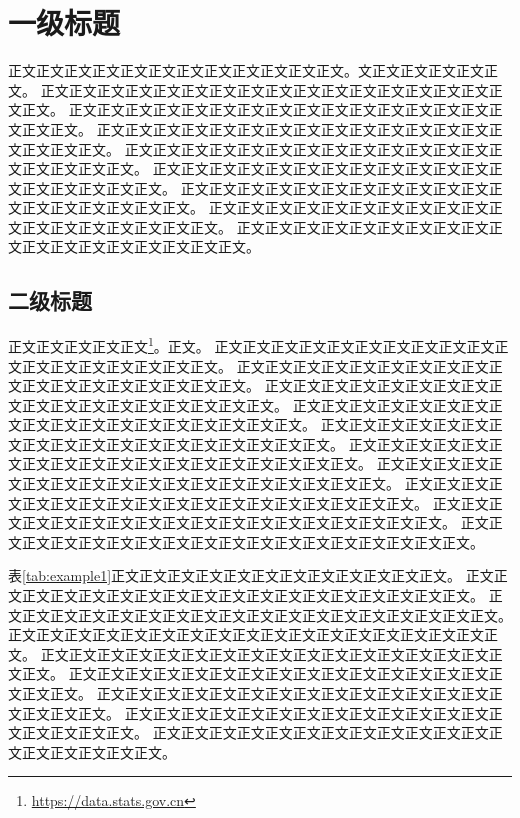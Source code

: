 
\chapter{一级标题}
正文正文正文正文正文正文正文正文正文正文正文正文。文正文正文正文正文正文。
正文正文正文正文正文正文正文正文正文正文正文正文正文正文正文正文正文正文。
正文正文正文正文正文正文正文正文正文正文正文正文正文正文正文正文正文正文。
正文正文正文正文正文正文正文正文正文正文正文正文正文正文正文正文正文正文。
正文正文正文正文正文正文正文正文正文正文正文正文正文正文正文正文正文正文。
正文正文正文正文正文正文正文正文正文正文正文正文正文正文正文正文正文正文。
正文正文正文正文正文正文正文正文正文正文正文正文正文正文正文正文正文正文。
正文正文正文正文正文正文正文正文正文正文正文正文正文正文正文正文正文正文。
正文正文正文正文正文正文正文正文正文正文正文正文正文正文正文正文正文正文。

\section{二级标题}
正文正文正文正文正文\footnote{\url{https://data.stats.gov.cn}}。正文。
正文正文正文正文正文正文正文正文正文正文正文正文正文正文正文正文正文正文。
正文正文正文正文正文正文正文正文正文正文正文正文正文正文正文正文正文正文。
正文正文正文正文正文正文正文正文正文正文正文正文正文正文正文正文正文正文。
正文正文正文正文正文正文正文正文正文正文正文正文正文正文正文正文正文正文。
正文正文正文正文正文正文正文正文正文正文正文正文正文正文正文正文正文正文。
正文正文正文正文正文正文正文正文正文正文正文正文正文正文正文正文正文正文。
正文正文正文正文正文正文正文正文正文正文正文正文正文正文正文正文正文正文。
正文正文正文正文正文正文正文正文正文正文正文正文正文正文正文正文正文正文。
正文正文正文正文正文正文正文正文正文正文正文正文正文正文正文正文正文正文。
正文正文正文正文正文正文正文正文正文正文正文正文正文正文正文正文正文正文。

表\ref{tab:example1}正文正文正文正文正文正文正文正文正文正文正文正文。
正文正文正文正文正文正文正文正文正文正文正文正文正文正文正文正文正文正文。
正文正文正文正文正文正文正文正文正文正文正文正文正文正文正文正文正文正文。
正文正文正文正文正文正文正文正文正文正文正文正文正文正文正文正文正文正文。
正文正文正文正文正文正文正文正文正文正文正文正文正文正文正文正文正文正文。
正文正文正文正文正文正文正文正文正文正文正文正文正文正文正文正文正文正文。
正文正文正文正文正文正文正文正文正文正文正文正文正文正文正文正文正文正文。
正文正文正文正文正文正文正文正文正文正文正文正文正文正文正文正文正文正文。
正文正文正文正文正文正文正文正文正文正文正文正文正文正文正文正文正文正文。

